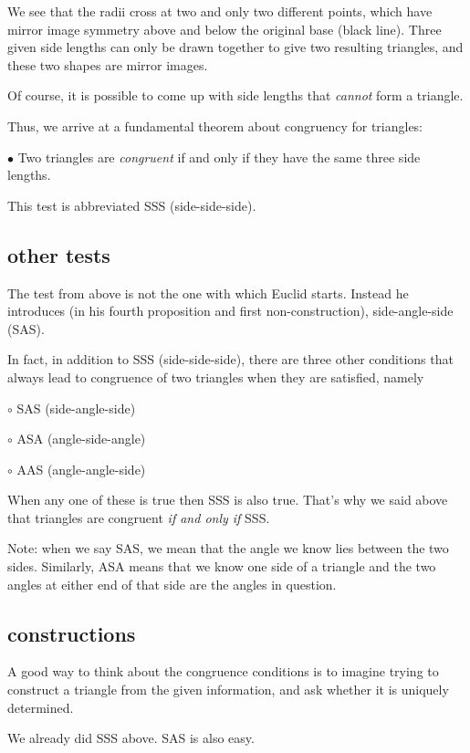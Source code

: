 \documentclass[11pt, oneside]{article}
\begin{document}
We see that the radii cross at two and only two different points, which have mirror image symmetry above and below the original base (black line).  Three given side lengths can only be drawn together to give two resulting triangles, and these two shapes are mirror images.

Of course, it is possible to come up with side lengths that \emph{cannot} form a triangle.

Thus, we arrive at a fundamental theorem about congruency for triangles:

$\bullet$  Two triangles are \emph{congruent} if and only if they have the same three side lengths. 

This test is abbreviated SSS (side-side-side).

\subsection*{other tests}

The test from above is not the one with which Euclid starts.  Instead he introduces (in his fourth proposition and first non-construction), side-angle-side (SAS).

In fact, in addition to SSS (side-side-side), there are three other conditions that always lead to congruence of two triangles when they are satisfied, namely

$\circ$  SAS (side-angle-side)

$\circ$  ASA (angle-side-angle)

$\circ$  AAS (angle-angle-side)

When any one of these is true then SSS is also true.  That's why we said above that triangles are congruent \emph{if and only if} SSS.

Note:  when we say SAS, we mean that the angle we know lies between the two sides.  Similarly, ASA means that we know one side of a triangle and the two angles at either end of that side are the angles in question.

\subsection*{constructions}

A good way to think about the congruence conditions is to imagine trying to construct a triangle from the given information, and ask whether it is uniquely determined.  

\label{sec:SAS}

We already did SSS above.  SAS is also easy.
\end{document}
